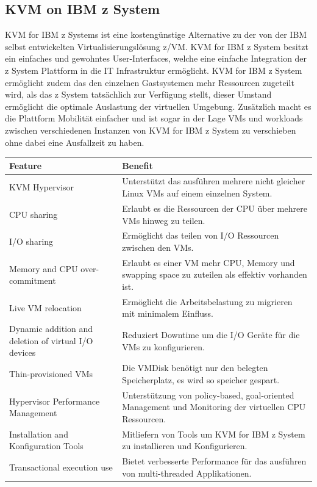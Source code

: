 \documentclass[14pt]{extreport}
\begin{document}
\newpage
\subsection{KVM on IBM z System}
KVM for IBM z Systems ist eine kostengünstige Alternative zu der von der IBM selbst entwickelten Virtualisierungslösung z/VM. KVM for IBM z System besitzt ein einfaches und gewohntes User-Interfaces, welche eine einfache Integration der z System Plattform in die IT Infrastruktur ermöglicht.
KVM for IBM z System ermöglicht zudem das den einzelnen Gastsystemen mehr Ressourcen zugeteilt wird, als das z System tatsächlich zur Verfügung stellt, dieser Umstand ermöglicht die optimale Auslastung der virtuellen Umgebung. Zusätzlich macht es die Plattform Mobilität einfacher und ist sogar in der Lage VMs und workloads zwischen verschiedenen Instanzen von KVM for IBM z System zu verschieben ohne dabei eine Ausfallzeit zu haben. \cite{website:ibm}
\begin{longtable}{|p{5cm}|p{10cm}|}
\hline
\textbf{Feature}                                     & \textbf{Benefit}                                                                                      \\ \hline
KVM Hypervisor                                       & Unterstützt das ausführen mehrere nicht gleicher Linux VMs auf einem einzelnen System.                  \\ \hline
CPU sharing                                          & Erlaubt es die Ressourcen der CPU über mehrere VMs hinweg zu teilen.                                   \\ \hline
I/O sharing                                          & Ermöglicht das teilen von I/O Ressourcen zwischen den VMs.                                             \\ \hline
Memory and CPU over-commitment                       & Erlaubt es einer VM mehr CPU, Memory und swapping space zu zuteilen als effektiv vorhanden ist.       \\ \hline
Live VM relocation                                   & Ermöglicht die Arbeitsbelastung zu migrieren mit minimalem Einfluss.                                  \\ \hline
Dynamic addition and deletion of virtual I/O devices & Reduziert Downtime um die I/O Geräte für die VMs zu konfigurieren.                                    \\ \hline
Thin-provisioned VMs                                 & Die VMDisk benötigt nur den belegten Speicherplatz, es wird so speicher gespart.                      \\ \hline
Hypervisor Performance Management                    & Unterstützung von policy-based, goal-oriented Management und Monitoring der virtuellen CPU Ressourcen. \\ \hline
Installation and Konfiguration Tools                 & Mitliefern von Tools um KVM for IBM z System zu installieren und Konfigurieren.                     \\ \hline
Transactional execution use                          & Bietet verbesserte Performance für das ausführen von multi-threaded Applikationen.                     \\ \hline
\end{longtable}
\end{document}
